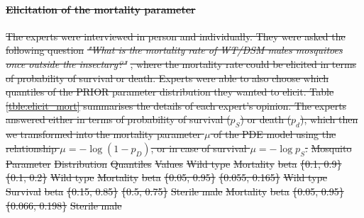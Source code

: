 \documentclass[]{bmcart}
\providecommand{\DIFdeltex}[1]{{\protect\color{red}\sout{#1}}}                      %
\providecommand{\DIFdelFL}[1]{\DIFdel{#1}} %
\providecommand{\DIFdel}[1]{\texorpdfstring{\DIFdeltex{#1}}{}} %
\begin{document}
\begin{backmatter}
\paragraph{\DIFdel{Elicitation of the mortality parameter}}
\addtocounter{paragraph}{-1}%
\DIFdel{The experts were interviewed in person and individually. They were asked the following question }\emph{\DIFdel{"What is the mortality rate of WT/DSM males mosquitoes once outside the insectary?"}}%
\DIFdel{, where the mortality rate could be elicited in terms of probability of  survival or death. Experts were able to also choose which quantiles of the PRIOR  parameter distribution they wanted to elicit. Table \ref{tble:elicit_mort} summarises the details of each expert's opinion. The experts answered either in terms of probability of survival ($p_S$) or  death ($p_d$), which then we transformed into the mortality parameter $\mu$ of the PDE model using the relationship $\mu = - \log( 1-p_D)$, or in case of survival $\mu = -\log p_S$.
}%
\DIFdelFL{Mosquito }%
\DIFdelFL{Parameter }%
\DIFdelFL{Distribution }%
\DIFdelFL{Quantiles }%
\DIFdelFL{Values  }%
\DIFdelFL{Wild type }%
\DIFdelFL{Mortality }%
\DIFdelFL{beta }%
\DIFdelFL{\{0.1, 0.9\} }%
\DIFdelFL{\{0.1, 0.2\}}%
\DIFdelFL{Wild type }%
\DIFdelFL{Mortality }%
\DIFdelFL{beta }%
\DIFdelFL{\{0.05, 0.95\} }%
\DIFdelFL{\{0.055, 0.165\}}%
\DIFdelFL{Wild type }%
\DIFdelFL{Survival }%
\DIFdelFL{beta }%
\DIFdelFL{\{0.15, 0.85\} }%
\DIFdelFL{\{0.5, 0.75\}}%
\DIFdelFL{Sterile male }%
\DIFdelFL{Mortality }%
\DIFdelFL{beta }%
\DIFdelFL{\{0.05, 0.95\} }%
\DIFdelFL{\{0.066, 0.198\}}%
\DIFdelFL{Sterile male }%

\end{backmatter}
\end{document}
